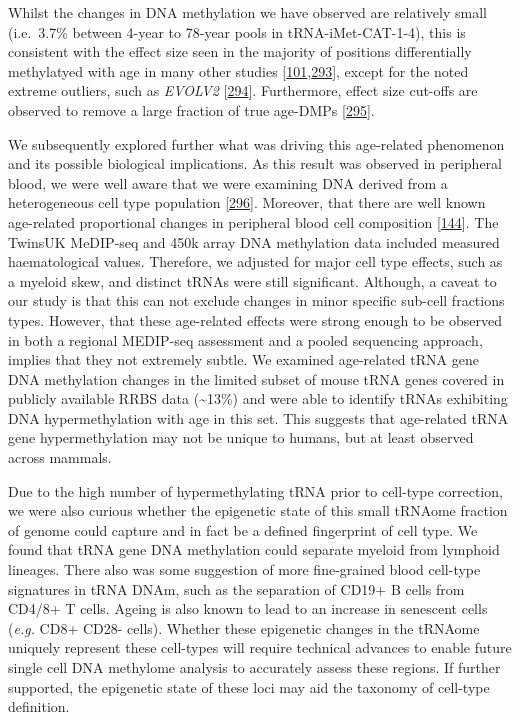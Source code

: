 \documentclass[
]{book}
\begin{document}
Whilst the changes in DNA methylation we have observed are relatively small (i.e.~3.7\% between 4-year to 78-year pools in tRNA-iMet-CAT-1-4), this is consistent with the effect size seen in the majority of positions differentially methylatyed with age in many other studies {[}\protect\hyperlink{ref-Slieker2016}{101},\protect\hyperlink{ref-Xu2014b}{293}{]}, except for the noted extreme outliers, such as \emph{EVOLV2} {[}\protect\hyperlink{ref-Slieker2018}{294}{]}.
Furthermore, effect size cut-offs are observed to remove a large fraction of true age-DMPs {[}\protect\hyperlink{ref-Zhu2018}{295}{]}.

We subsequently explored further what was driving this age-related phenomenon and its possible biological implications.
As this result was observed in peripheral blood, we were well aware that we were examining DNA derived from a heterogeneous cell type population {[}\protect\hyperlink{ref-Lappalainen2017}{296}{]}.
Moreover, that there are well known age-related proportional changes in peripheral blood cell composition {[}\protect\hyperlink{ref-Geiger2013}{144}{]}.
The TwinsUK MeDIP-seq and 450k array DNA methylation data included measured haematological values.
Therefore, we adjusted for major cell type effects, such as a myeloid skew, and distinct tRNAs were still significant.
Although, a caveat to our study is that this can not exclude changes in minor specific sub-cell fractions types.
However, that these age-related effects were strong enough to be observed in both a regional MEDIP-seq assessment and a pooled sequencing approach, implies that they not extremely subtle.
We examined age-related tRNA gene DNA methylation changes in the limited subset of mouse tRNA genes covered in publicly available RRBS data (\textasciitilde13\%) and were able to identify tRNAs exhibiting DNA hypermethylation with age in this set.
This suggests that age-related tRNA gene hypermethylation may not be unique to humans, but at least observed across mammals.

Due to the high number of hypermethylating tRNA prior to cell-type correction, we were also curious whether the epigenetic state of this small tRNAome fraction of genome could capture and in fact be a defined fingerprint of cell type.
We found that tRNA gene DNA methylation could separate myeloid from lymphoid lineages.
There also was some suggestion of more fine-grained blood cell-type signatures in tRNA DNAm, such as the separation of CD19+ B cells from CD4/8+ T cells.
Ageing is also known to lead to an increase in senescent cells (\emph{e.g.} CD8+ CD28- cells).
Whether these epigenetic changes in the tRNAome uniquely represent these cell-types will require technical advances to enable future single cell DNA methylome analysis to accurately assess these regions.
If further supported, the epigenetic state of these loci may aid the taxonomy of cell-type definition.
\end{document}
